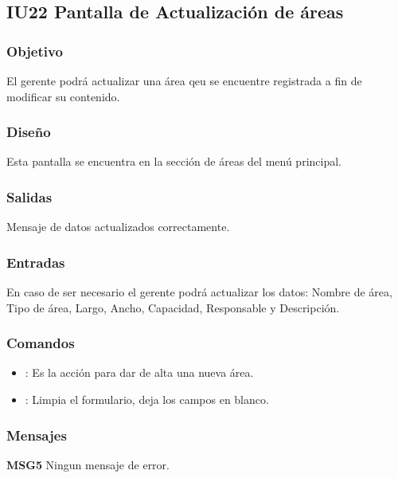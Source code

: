 \subsection{IU22 Pantalla de Actualización de áreas}

\subsubsection{Objetivo}
	El gerente podrá actualizar una área qeu se encuentre registrada a fin de modificar su contenido.

\subsubsection{Diseño}
	Esta pantalla se encuentra en la sección de áreas del menú principal.


\subsubsection{Salidas}

	Mensaje de datos actualizados correctamente.

\subsubsection{Entradas}
En caso de ser necesario el gerente podrá actualizar los datos: Nombre de área, Tipo de área, Largo, Ancho, Capacidad, Responsable y Descripción.

\subsubsection{Comandos}
\begin{itemize}
	\item {}: Es la acción para dar de alta una nueva área.
	\item {}: Limpia el formulario, deja los campos en blanco.
\end{itemize}

\subsubsection{Mensajes}
	\begin{Citemize}
		\item {\bf MSG5} Ningun mensaje de error.
	\end{Citemize}
